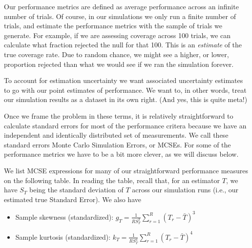 \documentclass[
]{book}
\providecommand{\tightlist}{%
  \setlength{\itemsep}{0pt}\setlength{\parskip}{0pt}}
\begin{document}
Our performance metrics are defined as average performance across an infinite number of trials.
Of course, in our simulations we only run a finite number of trials, and estimate the performance metrics with the sample of trials we generate.
For example, if we are assessing coverage across 100 trials, we can calculate what fraction rejected the null for that 100.
This is an \emph{estimate} of the true coverage rate.
Due to random chance, we might see a higher, or lower, proportion rejected than what we would see if we ran the simulation forever.

To account for estimation uncertainty we want associated uncertainty estimates to go with our point estimates of performance.
We want to, in other words, treat our simulation results as a dataset in its own right.
(And yes, this is quite meta!)

Once we frame the problem in these terms, it is relatively straightforward to calculate standard errors for most of the performance critera because we have an independent and identically distributed set of measurements.
We call these standard errors Monte Carlo Simulation Errors, or MCSEs.
For some of the performance metrics we have to be a bit more clever, as we will discuss below.

We list MCSE expressions for many of our straightforward performance measures on the following table.
In reading the table, recall that, for an estimator \(T\), we have \(S_T\) being the standard deviation of \(T\) across our simulation runs (i.e., our estimated true Standard Error).
We also have

\begin{itemize}
\tightlist
\item
  Sample skewness (standardized): \(\displaystyle{g_T = \frac{1}{R S_T^3}\sum_{r=1}^R \left(T_r - \bar{T}\right)^3}\)
\item
  Sample kurtosis (standardized): \(\displaystyle{k_T = \frac{1}{R S_T^4} \sum_{r=1}^R \left(T_r - \bar{T}\right)^4}\)
\end{itemize}
\end{document}
